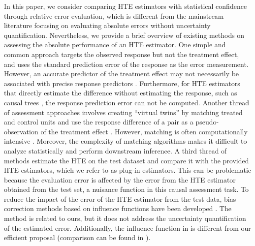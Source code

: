 \documentclass{article}
\theoremstyle{plain}
\theoremstyle{definition}
\theoremstyle{plain}
\begin{document}
In this paper, we consider comparing HTE estimators with statistical confidence through relative error evaluation, which is different from the mainstream literature focusing on evaluating absolute errors without uncertainty quantification. 
Nevertheless, we provide a brief overview of existing methods on assessing the absolute performance of an HTE estimator.
One simple and common approach targets the observed response but not the treatment effect, and uses the standard prediction error of the response as the error measurement.
However, an accurate predictor of the treatment effect may not necessarily be associated with precise response predictors \parencite{curth2023search}.
Furthermore, for HTE estimators that directly estimate the difference without estimating the response, such as causal trees \parencite{athey2016recursive}, the response prediction error can not be computed.
Another thread of assessment approaches involves creating ``virtual twins'' by matching treated and control units and use the response difference of a pair as a pseudo-observation of the treatment effect \parencite{rolling2014model}.
However, matching is often computationally intensive \parencite{rosenbaum1989optimal}. Moreover, the complexity of matching algorithms makes it difficult to analyze statistically and perform downstream inference.
A third thread of methods estimate the HTE on the test dataset and compare it with the provided HTE estimators, which we refer to as plug-in estimators. This can be problematic because the evaluation error is affected by the error from the HTE estimator obtained from the test set, a nuisance function in this causal assessment task.
To reduce the impact of the error of the HTE estimator from the test data, bias correction methods based on influence functions have been developed \parencite{alaa2019validating}. 
The method is related to ours, but it does not address the uncertainty quantification of the estimated error.
Additionally, the influence function in \parencite{alaa2019validating} is different from our efficient proposal (comparison can be found in ).
\end{document}
